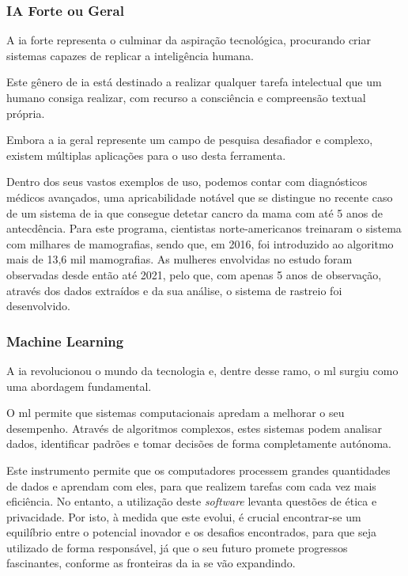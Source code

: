 \documentclass{report}
\begin{document}
\nocite{alexa}

\subsubsection{IA Forte ou Geral}
\label{subsubsec.ia_forte}

	A \ac{ia} forte representa o culminar da aspiração tecnológica, procurando criar sistemas capazes de replicar a inteligência humana. 

    Este gênero de \ac{ia} está destinado a realizar qualquer tarefa intelectual que um humano consiga realizar, com recurso a consciência e compreensão textual própria. \cite{tipos} \cite{iaforte}

    Embora a \ac{ia} geral represente um campo de pesquisa desafiador e complexo, existem múltiplas aplicações para o uso desta ferramenta. 
    
    Dentro dos seus vastos exemplos de uso, podemos contar com diagnósticos médicos avançados, uma apricabilidade notável que se distingue no recente caso de um sistema de \ac{ia} que consegue detetar cancro da mama com até 5 anos de antecdência. Para este programa, cientistas norte-americanos treinaram o sistema com milhares de mamografias, sendo que, em 2016, foi introduzido ao algoritmo mais de 13,6 mil mamografias. As mulheres envolvidas no estudo foram observadas desde então até 2021, pelo que, com apenas 5 anos de observação, através dos dados extraídos e da sua análise, o sistema de rastreio foi desenvolvido. \cite{cancro} \cite{cancro2}

\subsubsection{Machine Learning}
\label{subsubsec.ml}

	A \ac{ia} revolucionou o mundo da tecnologia e, dentre desse ramo, o \ac{ml} surgiu como uma abordagem fundamental.
	
    O \ac{ml} permite que sistemas computacionais apredam a melhorar o seu desempenho. Através de algoritmos complexos, estes sistemas podem analisar dados, identificar padrões e tomar decisões de forma completamente autónoma.

    Este instrumento permite que os computadores processem grandes quantidades de dados e aprendam com eles, para que realizem tarefas com cada vez mais eficiência. No entanto, a utilização deste \textit{software} levanta questões de ética e privacidade. Por isto, à medida que este evolui, é crucial encontrar-se um equilíbrio entre o potencial inovador e os desafios encontrados, para que seja utilizado de forma responsável, já que o seu futuro promete progressos fascinantes, conforme as fronteiras da \ac{ia} se vão expandindo.
    
\end{document}
